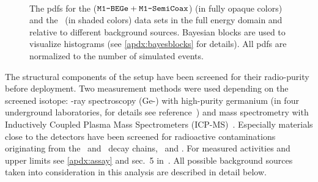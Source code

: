 \begin{figure}
  \centering
  \hfill

  \hfill
   \\

  \hfill

  \caption{%
    The pdfs for the  ($\texttt{M1-BEGe} + \texttt{M1-SemiCoax}$) (in fully opaque colors) and
    the \enrGeII\ (in shaded colors) data sets in the full energy domain and relative to
    different background sources. Bayesian blocks are used to visualize histograms (see
    \cref{apdx:bayesblocks} for details). All pdfs are normalized to the number of
    simulated events.
  }\label{fig:bkg:raw:ph2:pdfs:gmodel}
\end{figure}

The structural components of the setup have been screened for their radio-purity before
deployment. Two measurement methods were used depending on the screened isotope: \g-ray
spectroscopy (Ge-\g) with high-purity germanium (in four underground laboratories, for
details see reference~\cite{Ackermann2012}) and mass spectrometry with Inductively Coupled
Plasma Mass Spectrometers (ICP-MS)~\cite{Vacri2015}. Especially materials close to the
detectors have been screened for radioactive contaminations originating from the \Uh\ and
\Thh\ decay chains, \kvn\ and \Co. For measured activities and upper limits see
\cref{apdx:assay} and sec.~5 in~\cite{Agostini2018a}. All possible background sources
taken into consideration in this analysis are described in detail below.

